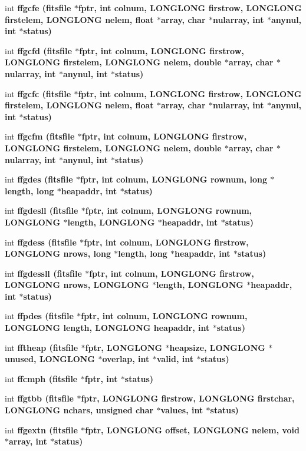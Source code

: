 \begin{CompactItemize}
\item 
int \bf{ffgcfe} (\bf{fitsfile} $\ast$fptr, int colnum, \bf{LONGLONG} firstrow, \bf{LONGLONG} firstelem, \bf{LONGLONG} nelem, float $\ast$array, char $\ast$nularray, int $\ast$anynul, int $\ast$status)
\item 
int \bf{ffgcfd} (\bf{fitsfile} $\ast$fptr, int colnum, \bf{LONGLONG} firstrow, \bf{LONGLONG} firstelem, \bf{LONGLONG} nelem, double $\ast$array, char $\ast$nularray, int $\ast$anynul, int $\ast$status)
\item 
int \bf{ffgcfc} (\bf{fitsfile} $\ast$fptr, int colnum, \bf{LONGLONG} firstrow, \bf{LONGLONG} firstelem, \bf{LONGLONG} nelem, float $\ast$array, char $\ast$nularray, int $\ast$anynul, int $\ast$status)
\item 
int \bf{ffgcfm} (\bf{fitsfile} $\ast$fptr, int colnum, \bf{LONGLONG} firstrow, \bf{LONGLONG} firstelem, \bf{LONGLONG} nelem, double $\ast$array, char $\ast$nularray, int $\ast$anynul, int $\ast$status)
\item 
int \bf{ffgdes} (\bf{fitsfile} $\ast$fptr, int colnum, \bf{LONGLONG} rownum, long $\ast$length, long $\ast$heapaddr, int $\ast$status)
\item 
int \bf{ffgdesll} (\bf{fitsfile} $\ast$fptr, int colnum, \bf{LONGLONG} rownum, \bf{LONGLONG} $\ast$length, \bf{LONGLONG} $\ast$heapaddr, int $\ast$status)
\item 
int \bf{ffgdess} (\bf{fitsfile} $\ast$fptr, int colnum, \bf{LONGLONG} firstrow, \bf{LONGLONG} nrows, long $\ast$length, long $\ast$heapaddr, int $\ast$status)
\item 
int \bf{ffgdessll} (\bf{fitsfile} $\ast$fptr, int colnum, \bf{LONGLONG} firstrow, \bf{LONGLONG} nrows, \bf{LONGLONG} $\ast$length, \bf{LONGLONG} $\ast$heapaddr, int $\ast$status)
\item 
int \bf{ffpdes} (\bf{fitsfile} $\ast$fptr, int colnum, \bf{LONGLONG} rownum, \bf{LONGLONG} length, \bf{LONGLONG} heapaddr, int $\ast$status)
\item 
int \bf{fftheap} (\bf{fitsfile} $\ast$fptr, \bf{LONGLONG} $\ast$heapsize, \bf{LONGLONG} $\ast$unused, \bf{LONGLONG} $\ast$overlap, int $\ast$valid, int $\ast$status)
\item 
int \bf{ffcmph} (\bf{fitsfile} $\ast$fptr, int $\ast$status)
\item 
int \bf{ffgtbb} (\bf{fitsfile} $\ast$fptr, \bf{LONGLONG} firstrow, \bf{LONGLONG} firstchar, \bf{LONGLONG} nchars, unsigned char $\ast$values, int $\ast$status)
\item 
int \bf{ffgextn} (\bf{fitsfile} $\ast$fptr, \bf{LONGLONG} offset, \bf{LONGLONG} nelem, void $\ast$array, int $\ast$status)

\end{CompactItemize}

